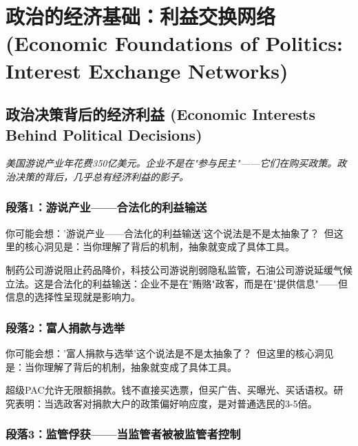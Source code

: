 \documentclass[a4paper,12pt]{book}
\newenvironment{motivation}{\begin{tcolorbox}[colback=gray!10,colframe=gray!60,title=\textit{动机}]\small\itshape}{\end{tcolorbox}}
\begin{document}
\begin{motivation}
\begin{motivation}
\begin{motivation}
	\section{政治的经济基础：利益交换网络 (Economic Foundations of Politics: Interest Exchange Networks)}

	\subsection{政治决策背后的经济利益 (Economic Interests Behind Political Decisions)}
	\begin{motivation}
		美国游说产业年花费350亿美元。企业不是在"参与民主"——它们在购买政策。政治决策的背后，几乎总有经济利益的影子。
	\end{motivation}

	\subsubsection*{段落1：游说产业——合法化的利益输送}

	\begin{tcolorbox}[colback=yellow!5, title=\textit{读者行为预测}]
		你可能会想：'游说产业——合法化的利益输送'这个说法是不是太抽象了？\ 但这里的核心洞见是：当你理解了背后的机制，抽象就变成了具体工具。
	\end{tcolorbox}

制药公司游说阻止药品降价，科技公司游说削弱隐私监管，石油公司游说延缓气候立法。这是合法化的利益输送：企业不是在"贿赂"政客，而是在"提供信息"——但信息的选择性呈现就是影响力。

	\subsubsection*{段落2：富人捐款与选举}

	\begin{tcolorbox}[colback=yellow!5, title=\textit{读者行为预测}]
		你可能会想：'富人捐款与选举'这个说法是不是太抽象了？\ 但这里的核心洞见是：当你理解了背后的机制，抽象就变成了具体工具。
	\end{tcolorbox}

超级PAC允许无限额捐款。钱不直接买选票，但买广告、买曝光、买话语权。研究表明：当选政客对捐款大户的政策偏好响应度，是对普通选民的3-5倍。

	\subsubsection*{段落3：监管俘获——当监管者被被监管者控制}


\end{motivation}
\end{motivation}
\end{motivation}
\end{document}
